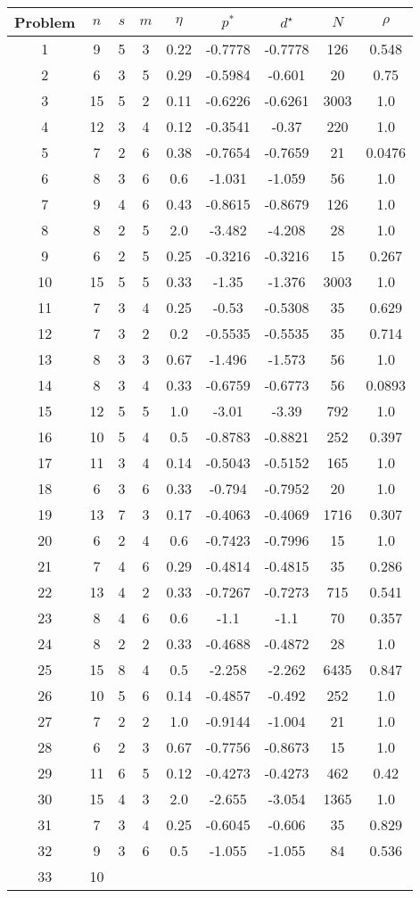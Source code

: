 \documentclass[smallextended,referee,envcountsect]{svjour3}
\begin{document}
\begin{table}[htbp]
\centering
\begin{tabular}{ccccccccc}
\hline
Problem & $n$ & $s$ & $m$ & $\eta$ & $p^*$ & $d^\star$ & $N$ & $\rho$ \\ 
\hline
1 & 9 & 5 & 3 & 0.22 & -0.7778 & -0.7778 & 126 & 0.548\\2 & 6 & 3 & 5 & 0.29 & -0.5984 & -0.601 & 20 & 0.75\\3 & 15 & 5 & 2 & 0.11 & -0.6226 & -0.6261 & 3003 & 1.0\\4 & 12 & 3 & 4 & 0.12 & -0.3541 & -0.37 & 220 & 1.0\\5 & 7 & 2 & 6 & 0.38 & -0.7654 & -0.7659 & 21 & 0.0476\\6 & 8 & 3 & 6 & 0.6 & -1.031 & -1.059 & 56 & 1.0\\7 & 9 & 4 & 6 & 0.43 & -0.8615 & -0.8679 & 126 & 1.0\\8 & 8 & 2 & 5 & 2.0 & -3.482 & -4.208 & 28 & 1.0\\9 & 6 & 2 & 5 & 0.25 & -0.3216 & -0.3216 & 15 & 0.267\\10 & 15 & 5 & 5 & 0.33 & -1.35 & -1.376 & 3003 & 1.0\\11 & 7 & 3 & 4 & 0.25 & -0.53 & -0.5308 & 35 & 0.629\\12 & 7 & 3 & 2 & 0.2 & -0.5535 & -0.5535 & 35 & 0.714\\13 & 8 & 3 & 3 & 0.67 & -1.496 & -1.573 & 56 & 1.0\\14 & 8 & 3 & 4 & 0.33 & -0.6759 & -0.6773 & 56 & 0.0893\\15 & 12 & 5 & 5 & 1.0 & -3.01 & -3.39 & 792 & 1.0\\16 & 10 & 5 & 4 & 0.5 & -0.8783 & -0.8821 & 252 & 0.397\\17 & 11 & 3 & 4 & 0.14 & -0.5043 & -0.5152 & 165 & 1.0\\18 & 6 & 3 & 6 & 0.33 & -0.794 & -0.7952 & 20 & 1.0\\19 & 13 & 7 & 3 & 0.17 & -0.4063 & -0.4069 & 1716 & 0.307\\20 & 6 & 2 & 4 & 0.6 & -0.7423 & -0.7996 & 15 & 1.0\\21 & 7 & 4 & 6 & 0.29 & -0.4814 & -0.4815 & 35 & 0.286\\22 & 13 & 4 & 2 & 0.33 & -0.7267 & -0.7273 & 715 & 0.541\\23 & 8 & 4 & 6 & 0.6 & -1.1 & -1.1 & 70 & 0.357\\24 & 8 & 2 & 2 & 0.33 & -0.4688 & -0.4872 & 28 & 1.0\\25 & 15 & 8 & 4 & 0.5 & -2.258 & -2.262 & 6435 & 0.847\\26 & 10 & 5 & 6 & 0.14 & -0.4857 & -0.492 & 252 & 1.0\\27 & 7 & 2 & 2 & 1.0 & -0.9144 & -1.004 & 21 & 1.0\\28 & 6 & 2 & 3 & 0.67 & -0.7756 & -0.8673 & 15 & 1.0\\29 & 11 & 6 & 5 & 0.12 & -0.4273 & -0.4273 & 462 & 0.42\\30 & 15 & 4 & 3 & 2.0 & -2.655 & -3.054 & 1365 & 1.0\\31 & 7 & 3 & 4 & 0.25 & -0.6045 & -0.606 & 35 & 0.829\\32 & 9 & 3 & 6 & 0.5 & -1.055 & -1.055 & 84 & 0.536\\33 & 10 
\end{tabular}
\end{table}
\end{document}
